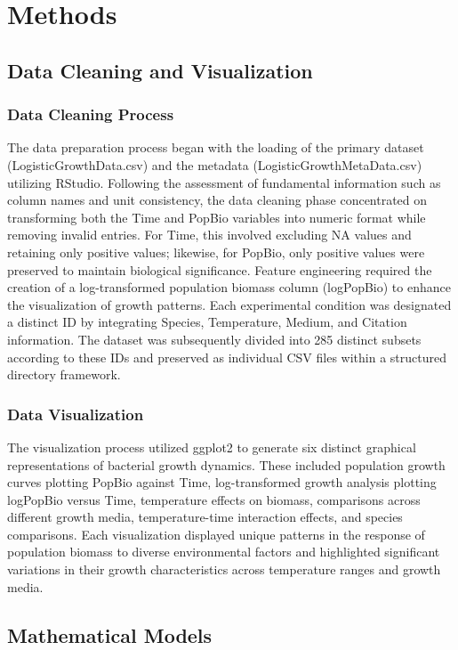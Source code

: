 \documentclass[11pt]{article}
\begin{document}
\section{Methods}

\subsection{Data Cleaning and Visualization}
\subsubsection{Data Cleaning Process}
The data preparation process began with the loading of the primary dataset (LogisticGrowthData.csv) and the metadata (LogisticGrowthMetaData.csv) utilizing RStudio. Following the assessment of fundamental information such as column names and unit consistency, the data cleaning phase concentrated on transforming both the Time and PopBio variables into numeric format while removing invalid entries. For Time, this involved excluding NA values and retaining only positive values; likewise, for PopBio, only positive values were preserved to maintain biological significance. Feature engineering required the creation of a log-transformed population biomass column (logPopBio) to enhance the visualization of growth patterns. Each experimental condition was designated a distinct ID by integrating Species, Temperature, Medium, and Citation information. The dataset was subsequently divided into 285 distinct subsets according to these IDs and preserved as individual CSV files within a structured directory framework.

\subsubsection{Data Visualization}
The visualization process utilized ggplot2 to generate six distinct graphical representations of bacterial growth dynamics. These included population growth curves plotting PopBio against Time, log-transformed growth analysis plotting logPopBio versus Time, temperature effects on biomass, comparisons across different growth media, temperature-time interaction effects, and species comparisons. Each visualization displayed unique patterns in the response of population biomass to diverse environmental factors and highlighted significant variations in their growth characteristics across temperature ranges and growth media.

\subsection{Mathematical Models}
\end{document}

